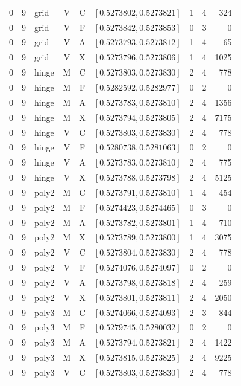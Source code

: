 \begin{longtable}{r r l c c l r r r}
0 & 9 & grid & V & C & $[0.5273802,0.5273821]$ & 1 & 4 & 324 \\
0 & 9 & grid & V & F & $[0.5273842,0.5273853]$ & 0 & 3 & 0 \\
0 & 9 & grid & V & A & $[0.5273793,0.5273812]$ & 1 & 4 & 65 \\
0 & 9 & grid & V & X & $[0.5273796,0.5273806]$ & 1 & 4 & 1025 \\
0 & 9 & hinge & M & C & $[0.5273803,0.5273830]$ & 2 & 4 & 778 \\
0 & 9 & hinge & M & F & $[0.5282592,0.5282977]$ & 0 & 2 & 0 \\
0 & 9 & hinge & M & A & $[0.5273783,0.5273810]$ & 2 & 4 & 1356 \\
0 & 9 & hinge & M & X & $[0.5273794,0.5273805]$ & 2 & 4 & 7175 \\
0 & 9 & hinge & V & C & $[0.5273803,0.5273830]$ & 2 & 4 & 778 \\
0 & 9 & hinge & V & F & $[0.5280738,0.5281063]$ & 0 & 2 & 0 \\
0 & 9 & hinge & V & A & $[0.5273783,0.5273810]$ & 2 & 4 & 775 \\
0 & 9 & hinge & V & X & $[0.5273788,0.5273798]$ & 2 & 4 & 5125 \\
0 & 9 & poly2 & M & C & $[0.5273791,0.5273810]$ & 1 & 4 & 454 \\
0 & 9 & poly2 & M & F & $[0.5274423,0.5274465]$ & 0 & 3 & 0 \\
0 & 9 & poly2 & M & A & $[0.5273782,0.5273801]$ & 1 & 4 & 710 \\
0 & 9 & poly2 & M & X & $[0.5273789,0.5273800]$ & 1 & 4 & 3075 \\
0 & 9 & poly2 & V & C & $[0.5273804,0.5273830]$ & 2 & 4 & 778 \\
0 & 9 & poly2 & V & F & $[0.5274076,0.5274097]$ & 0 & 2 & 0 \\
0 & 9 & poly2 & V & A & $[0.5273798,0.5273818]$ & 2 & 4 & 259 \\
0 & 9 & poly2 & V & X & $[0.5273801,0.5273811]$ & 2 & 4 & 2050 \\
0 & 9 & poly3 & M & C & $[0.5274066,0.5274093]$ & 2 & 3 & 844 \\
0 & 9 & poly3 & M & F & $[0.5279745,0.5280032]$ & 0 & 2 & 0 \\
0 & 9 & poly3 & M & A & $[0.5273794,0.5273821]$ & 2 & 4 & 1422 \\
0 & 9 & poly3 & M & X & $[0.5273815,0.5273825]$ & 2 & 4 & 9225 \\
0 & 9 & poly3 & V & C & $[0.5273803,0.5273830]$ & 2 & 4 & 778 \\

\end{longtable}
